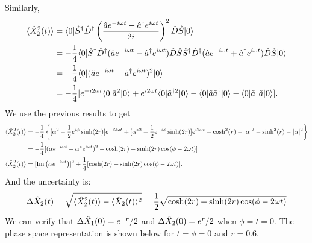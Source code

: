 Similarly,
\begin{align*}
\langle\hat{X}_2^2(t)\rangle&=\langle0|\hat{S}^\dagger\hat{D}^\dagger\left(\frac{\hat{a} e^{-i\omega t}-\hat{a}^\dagger e^{i\omega t}}{2i}\right)^2\hat{D}\hat{S}|0\rangle\\
&=-\frac{1}{4}\langle0|\hat{S}^\dagger\hat{D}^\dagger(\hat{a} e^{-i\omega t}-\hat{a}^\dagger e^{i\omega t})\hat{D}\hat{S}\hat{S}^\dagger\hat{D}^\dagger(\hat{a} e^{-i\omega t}+\hat{a}^\dagger e^{i\omega t})\hat{D}\hat{S}|0\rangle\\
&=-\frac{1}{4}\langle0|(\tilde{a}e^{-i\omega t}-\tilde{a}^\dagger e^{i\omega t})^2|0\rangle\\
&=-\frac{1}{4}[e^{-i2\omega t}\langle0|\tilde{a}^2|0\rangle+e^{i2\omega t}\langle0|\tilde{a}^{\dagger2}|0\rangle-\langle0|\tilde{a}\tilde{a}^\dagger|0\rangle-\langle0|\tilde{a}^\dagger\tilde{a}|0\rangle].
\end{align*}
We use the previous results to get
\begin{align*}
\langle\hat{X}^2_2(t)\rangle&=-\frac{1}{4}\left\{[\alpha^2-\frac{1}{2}e^{i\phi}\sinh(2r)]e^{-i2\omega t}+[\alpha^{*2}-\frac{1}{2}e^{-i\phi}\sinh(2r)]e^{i2\omega t}-
\cosh^2(r)-|\alpha|^2-\sinh^2(r)-|\alpha|^2\right\}\\
&=-\frac{1}{4}[(\alpha e^{-i\omega t}-\alpha^*e^{i\omega t})^2-\cosh(2r)-\sinh(2r)\cos(\phi-2\omega t)]\\
\langle\hat{X}_2^2(t)\rangle&=[\text{Im}\left(\alpha e^{-i\omega t}\right)]^2+\frac{1}{4}[\cosh(2r)+\sinh(2r)\cos(\phi-2\omega t)].
\end{align*}
And the uncertainty is:
\begin{align*}
\Delta\hat{X}_2(t)=\sqrt{\langle\hat{X}_2^2(t)\rangle-\langle\hat{X}_2(t)\rangle^2}=\frac{1}{2}\sqrt{\cosh(2r)+\sinh(2r)\cos(\phi-2\omega t)}
\end{align*}
We can verify that $\Delta\hat{X}_1(0)=e^{-r}/2$ and $\Delta\hat{X}_2(0)=e^r/2$ when $\phi=t=0$. 
The phase space representation is shown below for $t=\phi=0$ and $r=0.6$.
